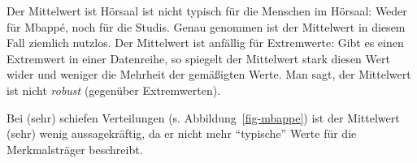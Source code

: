 \documentclass[
  letterpaper,
  twoside,
  open=any]{scrbook}
\theoremstyle{definition}
\theoremstyle{definition}
\theoremstyle{definition}
\theoremstyle{remark}
\begin{document}
Der Mittelwert ist Hörsaal ist nicht typisch für die Menschen im
Hörsaal: Weder für Mbappé, noch für die Studis. Genau genommen ist der
Mittelwert in diesem Fall ziemlich nutzlos. Der Mittelwert ist anfällig
für Extremwerte: Gibt es einen Extremwert in einer Datenreihe, so
spiegelt der Mittelwert stark diesen Wert wider und weniger die Mehrheit
der gemäßigten Werte. Man sagt, der Mittelwert ist nicht \emph{robust}
(gegenüber Extremwerten).

\begin{tcolorbox}[enhanced jigsaw, colbacktitle=quarto-callout-important-color!10!white, colframe=quarto-callout-important-color-frame, coltitle=black, arc=.35mm, breakable, opacitybacktitle=0.6, toprule=.15mm, colback=white, rightrule=.15mm, opacityback=0, toptitle=1mm, title=\textcolor{quarto-callout-important-color}{\faExclamation}\hspace{0.5em}{Wichtig}, titlerule=0mm, bottomtitle=1mm, bottomrule=.15mm, leftrule=.75mm, left=2mm]

Bei (sehr) schiefen Verteilungen (s. Abbildung~\ref{fig-mbappe}) ist der
Mittelwert (sehr) wenig aussagekräftig, da er nicht mehr
\enquote{typische} Werte für die Merkmalsträger beschreibt.

\end{tcolorbox}
\end{document}
